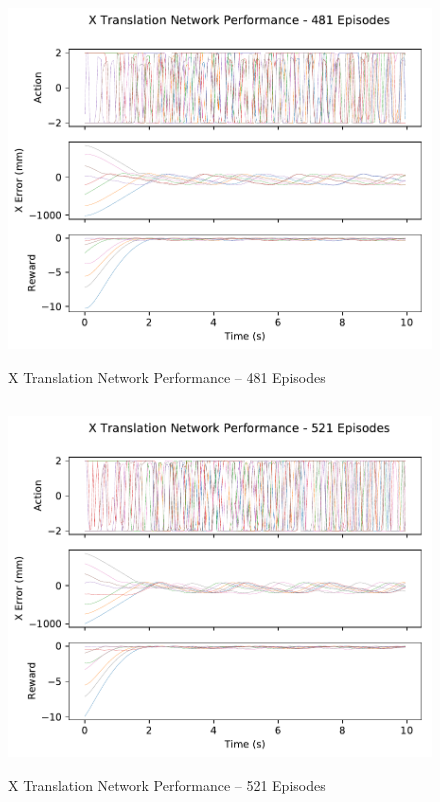 \begin{figure}[H]
	\centering
	\includegraphics[width=6in, height=3.85in, keepaspectratio]{figures/train_figs/transx_transitions/1_481.pdf}
	\caption{X Translation Network Performance -- 481 Episodes}
\end{figure}
\begin{figure}[H]
	\centering
	\includegraphics[width=6in, height=3.85in, keepaspectratio]{figures/train_figs/transx_transitions/1_521.pdf}
	\caption{X Translation Network Performance -- 521 Episodes}
\end{figure}
